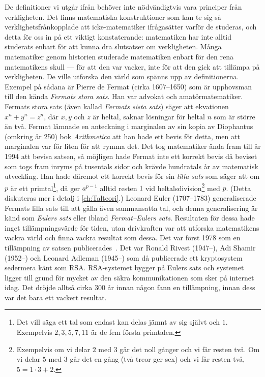 De definitioner vi utgår ifrån behöver inte nödvändigtvis vara principer från 
verkligheten.
Det finns matematiska konstruktioner som kan te sig så verklighetsfrånkopplade
att icke-matematiker ifrågasätter varför de studeras, och detta för oss in på
ett viktigt konstaterande:
matematiken har inte alltid studerats enbart för att kunna dra slutsatser om
verkligheten.
Många matematiker genom historien studerade matematiken enbart för den rena
matematikens skull --- för att den var vacker, inte för att den gick att
tillämpa på verkligheten.
De ville utforska den värld som spänns upp av definitionerna.
Exempel på sådana är Pierre de Fermat (cirka 1607--1650) som är upphovsman till 
den kända \emph{Fermats stora sats}.
Han var advokat och amatörmatematiker.
Fermats stora sats (även kallad \emph{Fermats sista sats}) säger att ekvationen
\(x^n+y^n=z^n\), där \(x,y\) och \(z\) är heltal, saknar lösningar för heltal
\(n\) som är större än två.
Fermat lämnade en anteckning i marginalen av sin kopia av Diophantus (omkring 
år 250) bok \emph{Arithmetica} att han hade ett bevis för detta, men att 
marginalen var för liten för att rymma det.
Det tog matematiker ända fram till år 1994 att bevisa satsen, så möjligen
hade Fermat inte ett korrekt bevis då beviset som togs fram inryms på tusentals 
sidor och krävde hundratals år av matematisk utveckling.
Han hade däremot ett korrekt bevis för sin \emph{lilla sats} som säger att om
\(p\) är ett primtal\footnote{%
  Det vill säga ett tal som endast kan delas jämnt av sig självt och \(1\).
  Exempelvis \(2, 3, 5, 7, 11\) är de fem första primtalen.
}, då ger \(a^{p-1}\) alltid resten \(1\) vid heltalsdivision\footnote{%
  Exempelvis om vi delar \(2\) med \(3\) går det noll gånger och vi får resten 
  två.
  Om vi delar \(5\) med \(3\) går det en gång (två treor ger sex) och vi får 
  resten två, \(5 = 1\cdot 3 + 2\).
} med \(p\).
(Detta diskuteras mer i detalj i \cref{ch:Talteori}.)
Leonard Euler (1707--1783) generaliserade Fermats lilla sats till att gälla även
sammansatta tal, och denna generalisering är känd som \emph{Eulers sats} eller 
ibland \emph{Fermat--Eulers sats}.
Resultaten för dessa hade inget tillämpningsvärde för tiden, utan drivkraften
var att utforska matematikens vackra värld och finna vackra resultat som dessa.
Det var först 1978 som en tillämpning av satsen publicerades~\cite{RSA1978}.
Det var Ronald Rivest (1947--), Adi Shamir (1952--) och Leonard Adleman 
(1945--) som då publicerade ett kryptosystem sedermera känt som RSA\@.
RSA-systemet bygger på Eulers sats och systemet ligger till grund för
mycket av den säkra kommunikationen som sker på internet idag.
Det dröjde alltså cirka 300 år innan någon fann en tillämpning, innan dess var 
det bara ett vackert resultat.

